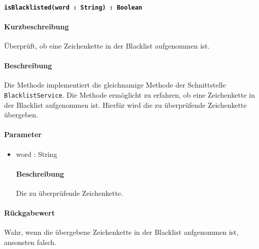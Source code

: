 \paragraph{\texttt{isBlacklisted(word : String) : Boolean}}%
\paragraph*{Kurzbeschreibung}
Überprüft, ob eine Zeichenkette in der Blacklist aufgenommen ist.
\paragraph*{Beschreibung}
Die Methode implementiert die gleichnamige Methode der Schnittstelle \texttt{BlacklistService}.
Die Methode ermöglicht zu erfahren, ob eine Zeichenkette in der Blacklist aufgenommen ist.
Hierfür wird die zu überprüfende Zeichenkette übergeben.
\paragraph*{Parameter}
\begin{itemize}
    \item word : String
    		\paragraph*{Beschreibung}
    		Die zu überprüfende Zeichenkette.
\end{itemize}
\paragraph*{Rückgabewert}
Wahr, wenn die übergebene Zeichenkette in der Blacklist anfgenommen ist, ansonsten falsch.
